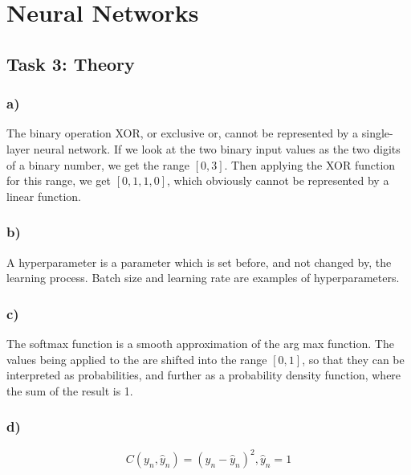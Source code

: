 \section{Neural Networks}
\subsection{Task 3: Theory}

\subsubsection*{a)}
The binary operation XOR, or exclusive or, cannot be represented by a single-layer neural network. If we look at the two binary input values as the two digits of a binary number, we get the range $[0, 3]$. Then applying the XOR function for this range, we get $[0, 1, 1, 0]$, which obviously cannot be represented by a linear function. 

\subsubsection*{b)}
A hyperparameter is a parameter which is set before, and not changed by, the learning process. Batch size and learning rate are examples of hyperparameters. 

\subsubsection*{c)}
The softmax function is a smooth approximation of the arg max function. The values being applied to the are shifted into the range $[0, 1]$, so that they can be interpreted as probabilities, and further as a probability density function, where the sum of the result is 1. 

\subsubsection*{d)}
\begin{equation}
    \label{eq:cost_function}
    C(y_n, \hat{y}_n) = (y_n - \hat{y}_n)^2, \hat{y}_n = 1
\end{equation}

